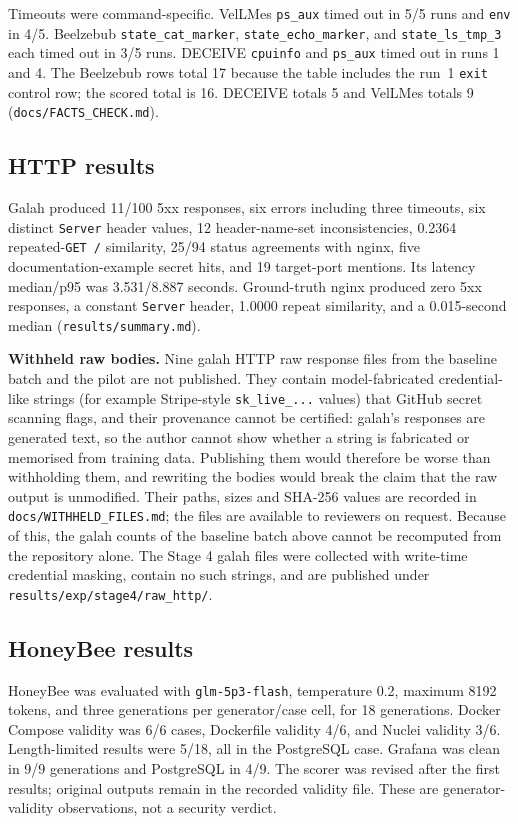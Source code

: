 \documentclass[a4paper,11pt]{article}
\begin{document}
Timeouts were command-specific. VelLMes \texttt{ps\_aux} timed out in 5/5 runs
and \texttt{env} in 4/5. Beelzebub \texttt{state\_cat\_marker},
\texttt{state\_echo\_marker}, and \texttt{state\_ls\_tmp\_3} each timed out in
3/5 runs. DECEIVE \texttt{cpuinfo} and \texttt{ps\_aux} timed out in runs 1
and 4. The Beelzebub rows total 17 because the table includes the run~1
\texttt{exit} control row; the scored total is 16. DECEIVE totals 5 and VelLMes
totals 9 (\texttt{docs/FACTS\_CHECK.md}).

\subsection{HTTP results}

Galah produced 11/100 5xx responses, six errors including three timeouts, six
distinct \texttt{Server} header values, 12 header-name-set inconsistencies,
0.2364 repeated-\texttt{GET /} similarity, 25/94 status agreements with nginx,
five documentation-example secret hits, and 19 target-port mentions. Its
latency median/p95 was 3.531/8.887 seconds. Ground-truth nginx produced zero
5xx responses, a constant \texttt{Server} header, 1.0000 repeat similarity,
and a 0.015-second median (\texttt{results/summary.md}).

\textbf{Withheld raw bodies.} Nine galah HTTP raw response files from the
baseline batch and the pilot are not published. They contain
model-fabricated credential-like strings (for example Stripe-style
\texttt{sk\_live\_...} values) that GitHub secret scanning flags, and their
provenance cannot be certified: galah's responses are generated text, so the
author cannot show whether a string is fabricated or memorised from training
data. Publishing them would therefore be worse than withholding them, and
rewriting the bodies would break the claim that the raw output is unmodified.
Their paths, sizes and SHA-256 values are recorded in
\texttt{docs/WITHHELD\_FILES.md}; the files are available to reviewers on
request. Because of this, the galah counts of the baseline batch above cannot
be recomputed from the repository alone. The Stage 4 galah files were
collected with write-time credential masking, contain no such strings, and are
published under \texttt{results/exp/stage4/raw\_http/}.

\subsection{HoneyBee results}

HoneyBee was evaluated with \texttt{glm-5p3-flash}, temperature 0.2, maximum
8192 tokens, and three generations per generator/case cell, for 18
generations. Docker Compose validity was 6/6 cases, Dockerfile validity 4/6,
and Nuclei validity 3/6. Length-limited results were 5/18, all in the
PostgreSQL case. Grafana was clean in 9/9 generations and PostgreSQL in 4/9.
The scorer was revised after the first results; original outputs remain in the
recorded validity file. These are generator-validity observations, not a
security verdict.
\end{document}
